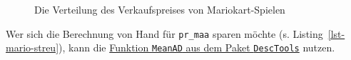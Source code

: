 \documentclass[
  letterpaper,
]{scrbook}
\theoremstyle{definition}
\theoremstyle{definition}
\theoremstyle{definition}
\theoremstyle{remark}
\begin{document}
\begin{figure}

\begin{minipage}{0.50\linewidth}



\end{minipage}%
%
\begin{minipage}{0.50\linewidth}



\end{minipage}%

\caption{\label{fig-var}Die Verteilung des Verkaufspreises von
Mariokart-Spielen}

\end{figure}%

Wer sich die Berechnung von Hand für \texttt{pr\_maa} sparen möchte (s.
Listing~\ref{lst-mario-streu}), kann die
\href{https://rdrr.io/cran/DescTools/man/MeanAD.html}{Funktion
\texttt{MeanAD} aus dem Paket \texttt{DescTools}} nutzen.
\end{document}
